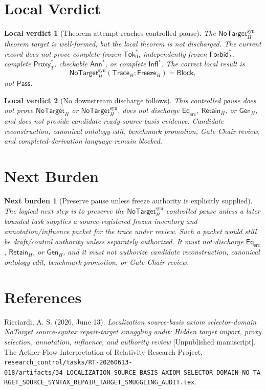 \documentclass[11pt]{article}
\newcommand{\GenH}{\mathsf{Gen}_{H}}
\newcommand{\EqSrc}{\mathsf{Eq}_{\mathrm{src}}}
\newcommand{\RetainH}{\mathsf{Retain}_{H}}
\newcommand{\NoTargetH}{\mathsf{NoTarget}_{H}}
\newcommand{\NoTargetSyn}{\mathsf{NoTarget}_{H}^{\mathrm{syn}}}
\newcommand{\SrcTok}{\mathsf{Tok}_{0}}
\newcommand{\ForbidT}{\mathsf{Forbid}_{T}}
\newcommand{\ProxyT}{\mathsf{Proxy}_{T}}
\newcommand{\TraceH}{\mathsf{Trace}_{H}}
\newcommand{\Annot}{\mathsf{Ann}}
\newcommand{\Influence}{\mathsf{Infl}}
\newcommand{\FreezeH}{\mathsf{Freeze}_{H}}
\newcommand{\Pass}{\mathsf{Pass}}
\newcommand{\Block}{\mathsf{Block}}
\newtheorem{localverdict}{Local verdict}
\newtheorem{nextburden}{Next burden}
\begin{document}
\section{Local Verdict}

\begin{localverdict}[Theorem attempt reaches controlled pause]
The \(\NoTargetSyn\) theorem target is well-formed, but the local theorem is
not discharged. The current record does not prove complete frozen
\(\SrcTok^{*}\), independently frozen \(\ForbidT^{*}\), complete
\(\ProxyT^{*}\), checkable \(\Annot^{*}\), or complete
\(\Influence^{*}\). The correct local result is
\[
    \NoTargetSyn(\TraceH;\FreezeH)=\Block,
\]
not \(\Pass\).
\end{localverdict}

\begin{localverdict}[No downstream discharge follows]
This controlled pause does not prove \(\NoTargetH\) or
\(\NoTargetSyn\), does not discharge \(\EqSrc\), \(\RetainH\), or
\(\GenH\), and does not provide candidate-ready source-basis evidence.
Candidate reconstruction, canonical ontology edit, benchmark promotion,
Gate Chair review, and completed-derivation language remain blocked.
\end{localverdict}

\section{Next Burden}

\begin{nextburden}[Preserve pause unless freeze authority is explicitly supplied]
The logical next step is to preserve the \(\NoTargetSyn\) controlled pause
unless a later bounded task supplies a source-registered frozen inventory
and annotation/influence packet for the trace under review. Such a packet
would still be draft/control authority unless separately authorized. It
must not discharge \(\EqSrc\), \(\RetainH\), or \(\GenH\), and it must not
authorize candidate reconstruction, canonical ontology edit, benchmark
promotion, or Gate Chair review.
\end{nextburden}

\section*{References}

Ricciardi, A. S. (2026, June 13). \emph{Localization source-basis axiom
selector-domain NoTarget source-syntax repair-target smuggling audit:
Hidden target import, proxy selection, annotation, influence, and authority
review} [Unpublished manuscript]. The Aether-Flow Interpretation of
Relativity Research Project,
\texttt{research\_control/tasks/RT-20260613-018/artifacts/34\_LOCALIZATION\_SOURCE\_BASIS\_AXIOM\_SELECTOR\_DOMAIN\_NO\_TARGET\_SOURCE\_SYNTAX\_REPAIR\_TARGET\_SMUGGLING\_AUDIT.tex}.
\end{document}
